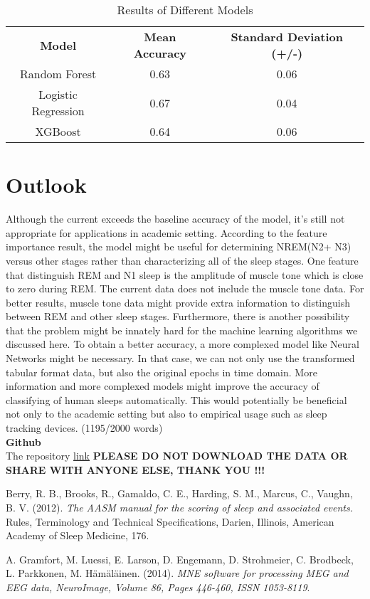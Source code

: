 \begin{table}[ht]
\centering
\caption{Results of Different Models} 
\begin{tabular}{ c c c }
 \textbf{Model} & \textbf{Mean Accuracy} & \textbf{Standard Deviation (+/-)} \\ 
 Random Forest & 0.63 & 0.06 \\  
 Logistic Regression & 0.67 & 0.04\\
 XGBoost & 0.64 & 0.06
\end{tabular}
\label{tab:result} 
\end{table}

\section*{Outlook}
Although the current exceeds the baseline accuracy of the model, it's still not appropriate for applications in academic setting. According to the feature importance result, the model might be useful for determining NREM(N2+ N3) versus other stages rather than characterizing all of the sleep stages. One feature that distinguish REM and N1 sleep is the amplitude of muscle tone which is close to zero during REM. The current data does not include the muscle tone data. For better results, muscle tone data might provide extra information to distinguish between REM and other sleep stages. Furthermore, there is another possibility that the problem might be innately hard for the machine learning algorithms we discussed here. To obtain a better accuracy, a more complexed model like Neural Networks might be necessary. In that case, we can not only use the transformed tabular format data, but also the original epochs in time domain. More information and more complexed models might improve the accuracy of classifying of human sleeps automatically. This would potentially be beneficial not only to the academic setting but also to empirical usage such as sleep tracking devices. (1195/2000 words)
\\

\textbf {Github} \\ 
The repository \href{https://github.com/zhiyanwang27/decoding_sleep}{link} \textbf{PLEASE DO NOT DOWNLOAD THE DATA OR SHARE WITH ANYONE ELSE, THANK YOU !!!} 
\begin{thebibliography}{9}
Berry, R. B., Brooks, R., Gamaldo, C. E., Harding, S. M., Marcus, C., Vaughn, B. V. (2012). \textit{The AASM manual for the scoring of sleep and associated events.} Rules, Terminology and Technical Specifications, Darien, Illinois, American Academy of Sleep Medicine, 176.

A. Gramfort, M. Luessi, E. Larson, D. Engemann, D. Strohmeier, C. Brodbeck, L. Parkkonen, M. Hämäläinen. (2014). \textit{MNE software for processing MEG and EEG data, NeuroImage, Volume 86, Pages 446-460, ISSN 1053-8119}. 
 
\end{thebibliography}


 




